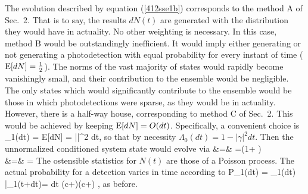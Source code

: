 \documentclass[12pt]{article}
\begin{document}
The evolution described by equation (\ref{412sse1b}) corresponds to the method A of
Sec.~2. That is to say, the results $dN(t)$ are generated with the
distribution they would have in actuality. No other weighting is necessary. In this
case, method B would be outstandingly inefficient. It would imply either generating
or not generating a photodetection with equal probability for every instant of time
(${\rm E}[dN]=\mbox{$\frac{1}{2}$}$). The norms of the vast majority of states would rapidly become
vanishingly small, and their contribution to the ensemble would be negligible. The
only states which would significantly contribute to the ensemble would be those in
which photodetections were sparse, as they would be in actuality. However, there is a
half-way house, corresponding to method C of Sec.~2. This would be achieved by
keeping ${\rm E}[dN]=O(dt)$. Specifically, a convenient choice is \beq
\Lambda_1(dt) = {\rm E}[dN] = |\gamma|^2 dt,
\eeq
so that by necessity $\Lambda_0(dt) = 1 - |\gamma|^2 dt$.
Then the unnormalized conditioned system state would evolve via
\bqa
{} &=&
=\left(1+
\right)  \\ 
 &=&
= 
\eqa
The ostensible statistics for $N(t)$ are those of a Poisson process. 
The actual probability for a detection varies in time according to
\beq
P_1(dt) = \Lambda_1(dt)  
\bar\psi_1(t+dt)\rangle = dt 
(c+\gamma)\dg (c+\gamma) ,
\eeq
as before.
\end{document}
